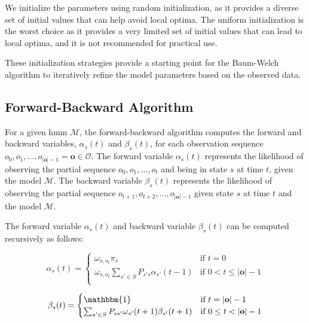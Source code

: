 We initialize the parameters using random initialization, as it provides a diverse set of initial values that can help avoid local optima.
The uniform initialization is the worst choice as it provides a very limited set of initial values that can lead to local optima, and it is not recommended for practical use.

These initialization strategies provide a starting point for the Baum-Welch algorithm to iteratively refine the model parameters based on the observed data.

\subsection{Forward-Backward Algorithm}\label{subsec:forward-backwards_algorithm}
For a given \gls{hmm} $\mathcal{M}$, the forward-backward algorithm computes the forward and backward variables, $\alpha_s(t)$ and $\beta_s(t)$, for each observation sequence $o_0, o_1, \dots, o_{|\mathbf{o}|-1} = \mathbf{o} \in \mathcal{O}$.
The forward variable $\alpha_s(t)$ represents the likelihood of observing the partial sequence $o_0, o_1, \dots, o_t$ and being in state $s$ at time $t$, given the model $\mathcal{M}$.
The backward variable $\beta_s(t)$ represents the likelihood of observing the partial sequence $o_{t+1}, o_{t+2}, \dots, o_{|\mathbf{o}|-1}$ given state $s$ at time $t$ and the model $\mathcal{M}$.

The forward variable $\alpha_s(t)$ and backward variable $\beta_s(t)$ can be computed recursively as follows:

\begin{equation}
    \alpha_s(t) =
    \begin{cases}
        \omega_{s, o_t} \pi_s & \text{if } t = 0 \\
        \omega_{s, o_t} \sum_{s' \in S} P_{s's}\alpha_{s'}(t - 1) & \text{if } 0 < t \leq |\mathbf{o}| - 1 \\
    \end{cases}
    \label{eq:forward-recursive}
\end{equation}


\begin{equation}
    \beta_s(t) =
    \begin{cases}
        \mathbbm{1} & \text{if } t = |\mathbf{o}| - 1 \\
        \sum_{s' \in S} P_{ss'} \omega_{s'}(t + 1) \beta_{s'}(t + 1) & \text{if } 0 \leq t < |\mathbf{o}| - 1 \\
    \end{cases}
    \label{eq:backward-recursive}
\end{equation}


